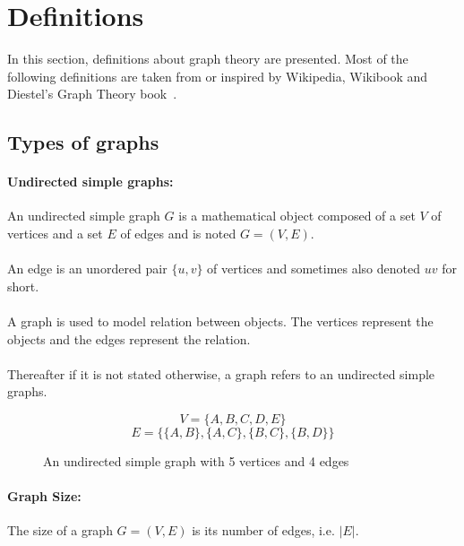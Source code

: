 \section{Definitions}
In this section, definitions about graph theory are presented. Most
of the following definitions are taken from or inspired by Wikipedia,
Wikibook and Diestel's Graph Theory book~\cite{Diestel}.

\subsection{Types of graphs}
\paragraph{Undirected simple graphs:}
An undirected simple graph $G$ is a mathematical object composed of a set $V$ of
vertices and a set $E$ of edges and is noted $G = (V,E)$.

\paragraph{}
An edge is an unordered pair $\{u,v\}$ of vertices and sometimes also denoted 
$uv$ for short.

\paragraph{}
A graph is used to model relation between objects. The vertices represent the 
objects and the edges represent the relation.

\paragraph{}
Thereafter if it is not stated otherwise, a graph refers to an undirected 
simple graphs.


\begin{figure}[!h]
  \begin{center}
    
  \end{center}
  $$V = \{A,B,C,D,E\}$$
  $$E = \Big\{\{A,B\},\{A,C\},\{B,C\},\{B,D\}\Big\}$$
  \caption{An undirected simple graph with 5 vertices and 4 edges}
\end{figure}

\paragraph{Graph Size:}
The size of a graph $G=(V,E)$ is its number of edges, i.e. $|E|$.

